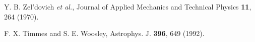 \begin{thebibliography}{11}


 Y. B. Zel’dovich {\it et al.}, Journal of Applied Mechanics and Technical Physics {\bf 11}, 264 (1970).














 F. X. Timmes and S. E. Woosley, Astrophys. J. {\bf 396}, 649 (1992).


\end{thebibliography}
